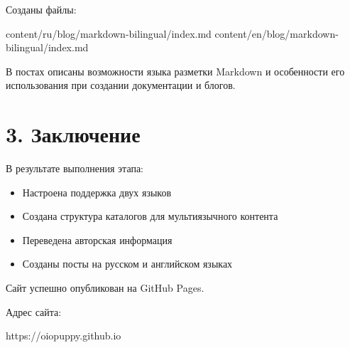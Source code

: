\documentclass[
  russian,
]{article}
\newenvironment{Shaded}{\begin{snugshade}}{\end{snugshade}}
\newcommand{\NormalTok}[1]{\textcolor[rgb]{0.00,0.23,0.31}{#1}}
\providecommand{\tightlist}{%
  \setlength{\itemsep}{0pt}\setlength{\parskip}{0pt}}
\begin{document}
Созданы файлы:

\begin{Shaded}
\begin{Highlighting}[]
\NormalTok{content/ru/blog/markdown{-}bilingual/index.md}
\NormalTok{content/en/blog/markdown{-}bilingual/index.md}
\end{Highlighting}
\end{Shaded}

В постах описаны возможности языка разметки Markdown и особенности его
использования при создании документации и блогов.

\section{3.
Заключение}\label{ux437ux430ux43aux43bux44eux447ux435ux43dux438ux435}

В результате выполнения этапа:

\begin{itemize}
\tightlist
\item
  Настроена поддержка двух языков
\item
  Создана структура каталогов для мультиязычного контента
\item
  Переведена авторская информация
\item
  Созданы посты на русском и английском языках
\end{itemize}

Сайт успешно опубликован на GitHub Pages.

Адрес сайта:

\begin{Shaded}
\begin{Highlighting}[]
\NormalTok{https://oiopuppy.github.io}
\end{Highlighting}
\end{Shaded}
\end{document}
